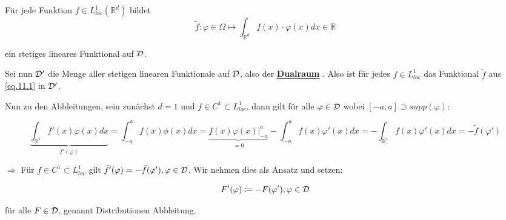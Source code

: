 \documentclass[ngerman]{article}
\theoremstyle{plain}
\theoremstyle{definition}
\numberwithin{equation}{section}
\newcommand{\R}[0] {
\mathbb R
}
\newcommand{\mim}[1] {
\underline{\textbf{#1\index{#1}}}
}
\newcommand{\C}[0]{
    \cdot
}
\begin{document}
Für jede Funktion $f \in L^1_{loc}(\R^d)$ bildet
\begin{equation}\label{eq.11.1}
    \tilde f:\varphi \in \Omega \mapsto \int_{\R^d} f(x) \C \varphi(x) dx \in \R
\end{equation}

ein stetiges lineares Funktional auf $\mathcal{D}$.

Sei nun $\mathcal{D}'$ die Menge aller stetigen linearen Funktionale auf $\mathcal{D}$, also der \mim{Dualraum}. Also ist für jedes $f \in L^1_{loc}$ das Funktional $\tilde f$ aus \eqref{eq.11.1} in $\mathcal{D}'$.

\begin{center}
\end{center}

Nun zu den Abbleitungen, sein zunächst $d=1$ und $f \in C^1 \subset L^1_{loc}$, dann gilt für alle $\varphi \in \mathcal{D}$ wobei $[-a,a] \supset supp(\varphi)$:

\[\underbrace{\int_{\R^1} f'(x) \varphi(x) dx}_{f'(\varphi)} = \int_{-a}^a f(x) \phi(x) dx = \underbrace{f(x)\varphi(x)|_{-a}^{a}}_{=0} - \int_{-a}^a f(x) \varphi'(x) dx = -\int_{\R^1} f(x) \varphi'(x) dx = -\tilde f(\varphi')\]

$\Rightarrow$ Für $f \in C^1 \subset L^1_{loc}$ gilt $\tilde f'(\varphi) = - \tilde f(\varphi'), \varphi \in \mathcal{D}$. Wir nehmen dies als Ansatz und setzen:

\begin{equation}\label{eq.11.2}
    F'(\varphi) \coloneqq -F(\varphi'), \varphi \in \mathcal{D}
\end{equation}

für alle $F\in \mathcal{D}$, genannt Distributionen Abbleitung.
\end{document}
